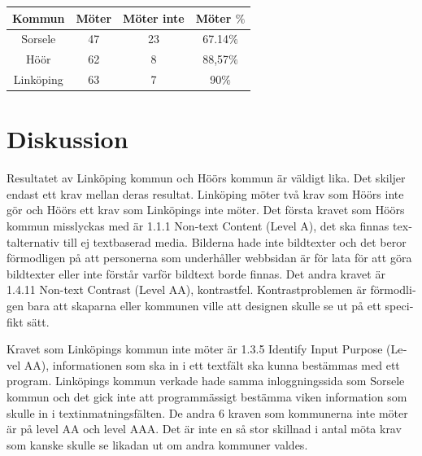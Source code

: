 \documentclass[11p]{article}
\begin{document}
\begin{otherlanguage}{swedish}
\begin{center}
    \begin{tabular}{ |c|c|c|c|}
        \hline
        Kommun & Möter & Möter inte & Möter $\%$ \\  \hline
        Sorsele & 47 & 23 & 67.14$\%$ \\ \hline
        Höör & 62 & 8 & 88,57$\%$ \\ \hline
        Linköping & 63 & 7 & 90$\%$ \\ \hline
    \end{tabular}
    \end{center}

    \section{Diskussion} %
    Resultatet av Linköping kommun och Höörs kommun är väldigt lika.
    Det skiljer endast ett krav mellan deras resultat.
    Linköping möter två krav som Höörs inte gör och Höörs ett krav som Linköpings inte möter.
    Det första kravet som  Höörs kommun misslyckas med är 1.1.1 Non-text Content (Level A), det ska finnas textalternativ till ej textbaserad media.
    Bilderna hade inte bildtexter och det beror förmodligen på att personerna som underhåller webbsidan är för lata för att göra bildtexter eller inte förstår varför bildtext borde finnas.
    Det andra kravet är 1.4.11 Non-text Contrast (Level AA), kontrastfel.
    Kontrastproblemen är förmodligen bara att skaparna eller kommunen ville att designen skulle se ut på ett specifikt sätt.

    Kravet som Linköpings kommun inte möter är 1.3.5 Identify Input Purpose (Level AA), informationen som ska in i ett textfält ska kunna bestämmas med ett program.
    Linköpings kommun verkade hade samma inloggningssida som Sorsele kommun och det gick inte att programmässigt bestämma viken information som skulle in i textinmatningsfälten.
    De andra 6 kraven som kommunerna inte möter är på level AA och level AAA.
    Det är inte en så stor skillnad i antal möta krav som kanske skulle se likadan ut om andra kommuner valdes.


\end{otherlanguage}
\end{document}
